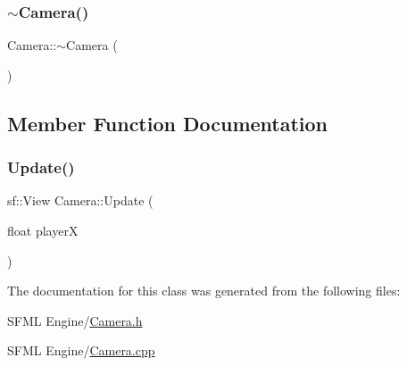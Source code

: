 \mbox{\label{class_camera_ad1897942d0ccf91052386388a497349f}} 
\subsubsection{\texorpdfstring{$\sim$\+Camera()}{~Camera()}}
{\footnotesize\ttfamily Camera\+::$\sim$\+Camera (\begin{DoxyParamCaption}{ }\end{DoxyParamCaption})}



\subsection{Member Function Documentation}
\mbox{\label{class_camera_a261c43250d32bcc95b26f092225a9d2f}} 
\subsubsection{\texorpdfstring{Update()}{Update()}}
{\footnotesize\ttfamily sf\+::\+View Camera\+::\+Update (\begin{DoxyParamCaption}\item[{float}]{playerX }\end{DoxyParamCaption})}



The documentation for this class was generated from the following files\+:\begin{DoxyCompactItemize}
\item 
S\+F\+M\+L Engine/\hyperlink{_camera_8h}{Camera.\+h}\item 
S\+F\+M\+L Engine/\hyperlink{_camera_8cpp}{Camera.\+cpp}\end{DoxyCompactItemize}
